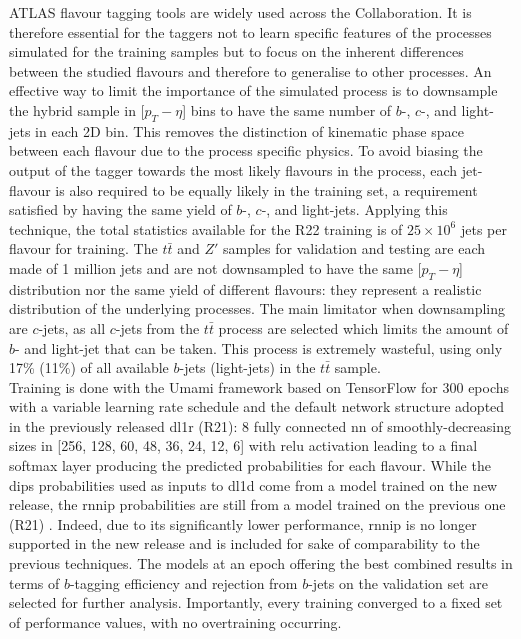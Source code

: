 ATLAS flavour tagging tools are widely used across the Collaboration. It is therefore essential for the taggers not to learn specific features of the processes simulated  for the training samples but to focus on the inherent differences between the studied flavours and therefore to generalise to other processes. An effective way to limit the importance of the simulated process is to downsample the hybrid sample in [$p_T - \eta$] bins to have the same number of $b$-, $c$-, and light-jets in each 2D bin. This removes the distinction of kinematic phase space between each flavour due to the process specific physics. To avoid biasing the output of the tagger towards the most likely flavours in the process, each jet-flavour is also required to be equally likely in the training set, a requirement satisfied by having the same yield of $b$-, $c$-, and light-jets. Applying this technique, the total statistics available for the R22 training is of $25 \times 10^{6}$ jets per flavour for training. The $t\bar{t}$ and $Z'$ samples for validation and testing are each made of 1 million jets and are not downsampled to have the same [$p_T - \eta$] distribution nor the same yield of different flavours: they represent a realistic distribution of the underlying processes. The main limitator when downsampling are $c$-jets, as all $c$-jets from the $t\bar{t}$ process are selected which limits the amount of $b$- and light-jet that can be taken. This process is extremely wasteful, using only 17\% (11\%) of all available $b$-jets (light-jets) in the $t\bar{t}$ sample.\\

Training is done with the Umami framework \cite{Umami} based on TensorFlow \cite{tensorflow2015-whitepaper} for 300 epochs with a variable learning rate schedule and the default network structure adopted in the previously released \gls{dl1r} (R21): 8 fully connected \gls{nn} of smoothly-decreasing sizes in [256, 128, 60, 48, 36, 24, 12, 6] with \gls{relu} activation leading to a final softmax layer producing the predicted probabilities for each flavour. While the \gls{dips} probabilities used as inputs to \gls{dl1d} come from a model trained on the new release, the \gls{rnnip} probabilities are still from a model trained on the previous one (R21) \cite{ATL-PHYS-PUB-2017-003, ATL-PHYS-PUB-2020-014}. Indeed, due to its significantly lower performance, \gls{rnnip} is no longer supported in the new release and is included for sake of comparability to the previous techniques. The models at an epoch offering the best combined results in terms of $b$-tagging efficiency and rejection from $b$-jets on the validation set are selected for further analysis. Importantly, every training converged to a fixed set of performance values, with no overtraining occurring.\\

